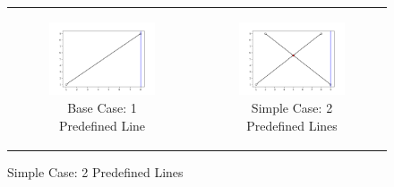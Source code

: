 \documentclass [12pt]{article}
\newlength{\toppush}
\def\subjnum{Comp 163}
\def\subjname{Computational Geometry}
\def\doheading#1#2#3{\vfill\eject\vspace*{-\toppush}%
  \vbox{\hbox to\textwidth{{\bf} \subjnum: \subjname \hfil Amy Bui}%
    \hbox to\textwidth{{\bf} Tufts University, Fall 2022 \hfil#3\strut}%
    \hrule}}
\newcommand{\htitle}[1]{\vspace*{3.25ex plus 1ex minus .2ex}%
\begin{center}
{\large\bf #1}
\end{center}}
\begin{document}

\begin{figure}[h] %
    \begin{tabular}{cc}
        \begin{subfigure}{0.5\textwidth}
            \centering
            \includegraphics[width=\textwidth]{images/1Line.png}
            \caption{Base Case: 1 Predefined Line}
        \end{subfigure} &
        \begin{subfigure}{0.5\textwidth}
            \centering
        \includegraphics[width=\textwidth]{images/2Lines.png}
        \caption{Simple Case: 2 Predefined Lines}
        \end{subfigure} \\ 

\end{tabular}
\end{figure}
\end{document}
